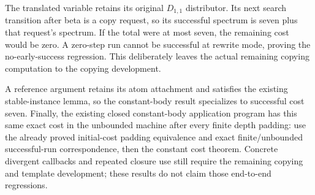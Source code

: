 
The translated variable retains its original $D_{1,1}$ distributor. Its next
search transition after beta is a copy request, so its successful spectrum is
seven plus that request's spectrum. If the total were at most seven, the
remaining cost would be zero. A zero-step run cannot be successful at rewrite
mode, proving the no-early-success regression. This deliberately leaves the
actual remaining copying computation to the copying development.



A reference argument retains its atom attachment and satisfies the existing
stable-instance lemma, so the constant-body result specializes to successful
cost seven. Finally, the existing closed constant-body application program
has this same exact cost in the unbounded machine after every finite depth
padding: use the already proved initial-cost padding equivalence and exact
finite/unbounded successful-run correspondence, then the constant cost theorem.
Concrete divergent callbacks and repeated closure use still require the
remaining copying and template development; these results do not claim those
end-to-end regressions.



